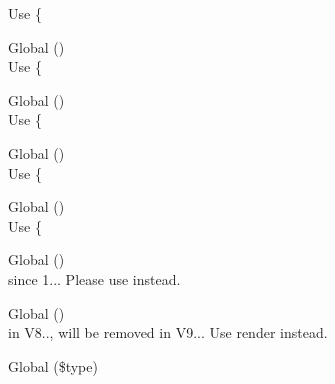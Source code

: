 \begin{DoxyRefList}
\label{deprecated__deprecated000370}%
%
Use \{ 
\item[Global \doxylink{class_ramsey_1_1_uuid_1_1_lazy_1_1_lazy_uuid_from_string_af66d1556704169933700e0570af220b2}{Lazy\+Uuid\+From\+String\+::get\+Time\+Hi\+And\+Version} ()]\hfill \\
\label{deprecated__deprecated000371}%
%
Use \{ 
\item[Global \doxylink{class_ramsey_1_1_uuid_1_1_lazy_1_1_lazy_uuid_from_string_a45160120925d388b15802b9a5a0354e6}{Lazy\+Uuid\+From\+String\+::get\+Time\+Low} ()]\hfill \\
\label{deprecated__deprecated000372}%
%
Use \{ 
\item[Global \doxylink{class_ramsey_1_1_uuid_1_1_lazy_1_1_lazy_uuid_from_string_a2b105a04ff09668e62f3f5da9ab7ff1f}{Lazy\+Uuid\+From\+String\+::get\+Time\+Mid} ()]\hfill \\
\label{deprecated__deprecated000373}%
%
Use \{ 
\item[Global \doxylink{class_ramsey_1_1_uuid_1_1_lazy_1_1_lazy_uuid_from_string_a92aa1d82129ec8cd803d64c28efcb30f}{Lazy\+Uuid\+From\+String\+::get\+Timestamp} ()]\hfill \\
\label{deprecated__deprecated000374}%
%
Use \{ 
\item[Global \doxylink{interface_mockery_1_1_legacy_mock_interface_accfe7d54e5fc5c8de26f7c5c24f2d4ba}{Legacy\+Mock\+Interface\+::should\+Defer\+Missing} ()]\hfill \\
\label{deprecated__deprecated000169}%
%
since 1... Please use  instead. 
\item[Global \doxylink{class_sabberworm_1_1_c_s_s_1_1_value_1_1_line_name_a7516ca30af0db3cdbf9a7739b48ce91d}{Line\+Name\+::\+\_\+\+\_\+to\+String} ()]\hfill \\
\label{deprecated__deprecated000425}%
%
in V8.., will be removed in V9... Use {\ttfamily render} instead.  
\item[Global \doxylink{class_dompdf_1_1_renderer_1_1_list_bullet_a57abf9e13492508c73e63a03cf1afce3}{List\+Bullet\+::get\+\_\+counter\+\_\+chars} (\$type)]\hfill \\
\label{deprecated__deprecated000049}%
%
  

\end{DoxyRefList}
